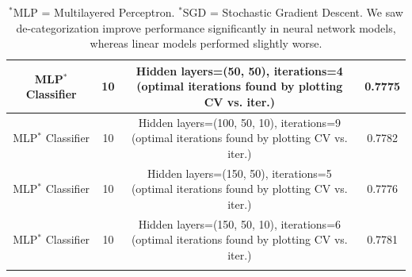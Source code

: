 \begin{longtable}{c|c|c|c}
MLP$^{*}$ Classifier & 10 & \makecell*{Hidden layers=(50, 50), iterations=4 \\ (optimal iterations found by plotting CV vs. iter.)} & 0.7775 \\\hline
MLP$^{*}$ Classifier & 10 & \makecell*{Hidden layers=(100, 50, 10), iterations=9 \\ (optimal iterations found by plotting CV vs. iter.)} & 0.7782 \\\hline
MLP$^{*}$ Classifier & 10 & \makecell*{Hidden layers=(150, 50), iterations=5 \\ (optimal iterations found by plotting CV vs. iter.)} & 0.7776 \\\hline
MLP$^{*}$ Classifier & 10 & \makecell*{Hidden layers=(150, 50, 10), iterations=6 \\ (optimal iterations found by plotting CV vs. iter.)} & 0.7781 \\\hline

\caption{$^{*}$MLP = Multilayered Perceptron. $^{*}$SGD = Stochastic Gradient Descent. We saw de-categorization improve performance significantly in neural network models, whereas linear models performed slightly worse.}
\end{longtable}

